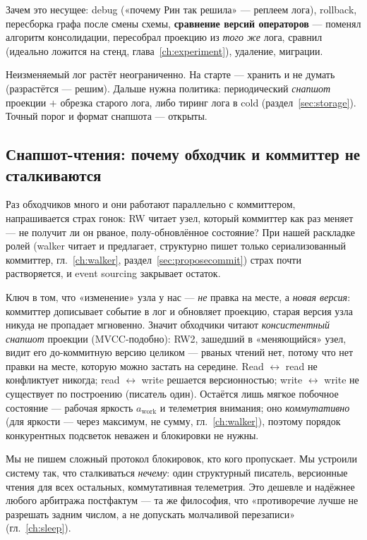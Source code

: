 Зачем это несущее: debug («почему Рин так решила» — реплеем лога), rollback,
пересборка графа после смены схемы, \textbf{сравнение версий операторов} — поменял
алгоритм консолидации, пересобрал проекцию из \emph{того же} лога, сравнил (идеально
ложится на стенд, глава~\ref{ch:experiment}), удаление, миграции.

\begin{openq}
Неизменяемый лог растёт неограниченно. На старте — хранить и не думать (разрастётся —
решим). Дальше нужна политика: периодический \emph{снапшот} проекции $+$ обрезка
старого лога, либо тиринг лога в cold (раздел~\ref{sec:storage}). Точный порог и
формат снапшота — открыты.
\end{openq}

\subsection{Снапшот-чтения: почему обходчик и коммиттер не сталкиваются}
\label{sec:snapshotreads}

Раз обходчиков много и они работают параллельно с коммиттером, напрашивается страх
гонок: RW читает узел, который коммиттер как раз меняет — не получит ли он рваное,
полу-обновлённое состояние? При нашей раскладке ролей (walker читает и предлагает,
структурно пишет только сериализованный коммиттер, гл.~\ref{ch:walker},
раздел~\ref{sec:proposecommit}) страх почти растворяется, и event sourcing закрывает
остаток.

Ключ в том, что «изменение» узла у нас — \emph{не} правка на месте, а \emph{новая
версия}: коммиттер дописывает событие в лог и обновляет проекцию, старая версия узла
никуда не пропадает мгновенно. Значит обходчики читают \emph{консистентный снапшот}
проекции (MVCC-подобно): RW2, зашедший в «меняющийся» узел, видит его до-коммитную
версию целиком — рваных чтений нет, потому что нет правки на месте, которую можно
застать на середине. Read $\leftrightarrow$ read не конфликтует никогда; read
$\leftrightarrow$ write решается версионностью; write $\leftrightarrow$ write не
существует по построению (писатель один). Остаётся лишь мягкое побочное состояние —
рабочая яркость $a_{\text{work}}$ и телеметрия внимания; оно \emph{коммутативно} (для
яркости — через максимум, не сумму, гл.~\ref{ch:walker}), поэтому порядок конкурентных
подсветок неважен и блокировки не нужны.

\begin{intuition}
Мы не пишем сложный протокол блокировок, кто кого пропускает. Мы устроили систему так,
что сталкиваться \emph{нечему}: один структурный писатель, версионные чтения для
всех остальных, коммутативная телеметрия. Это дешевле и надёжнее любого арбитража
постфактум — та же философия, что «противоречие лучше не разрешать задним числом, а
не допускать молчаливой перезаписи» (гл.~\ref{ch:sleep}).
\end{intuition}

